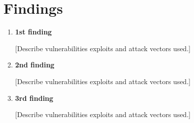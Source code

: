 \section{Findings}
\begin{enumerate}
\item \textbf{1st finding}

[Describe vulnerabilities exploits and attack vectors used.]
\item \textbf{2nd finding}

[Describe vulnerabilities exploits and attack vectors used.]
\item \textbf{3rd finding}

[Describe vulnerabilities exploits and attack vectors used.]

\end{enumerate}

